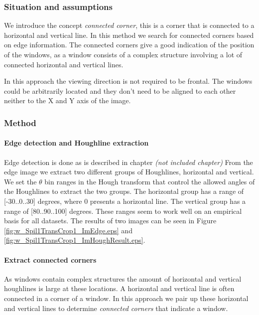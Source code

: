 \subsubsection{Situation and assumptions}
We introduce the concept \emph{connected corner}, this is a corner that is 
connected to a horizontal and vertical line.  
In this method we search for connected corners based on edge information.
The connected corners give a good indication of the position of the windows, as 
a window consists of a complex structure involving a lot of connected horizontal
and vertical lines. 

In this approach the viewing direction is not required to be frontal.
The windows could be arbitrarily located and they don't need
to be aligned to each other neither to the X and Y axis of the image.

\subsubsection{Method}
\paragraph{Edge detection and Houghline extraction}
Edge detection is done as is described in chapter 
\emph{(not included chapter)} %
From the edge image we extract two different groups of Houghlines, horizontal and 
vertical.  We set the $\theta$ bin ranges in the Hough transform that control the
allowed angles of the Houghlines to extract the two groups. The horizontal group
has a range of [-30..0..30] degrees, where 0 presents a horizontal line. The vertical
group has a range of [80..90..100] degrees. These ranges seem
to work well on an empirical basis for all datasets.
The results of two images can be seen in Figure \ref{fig:w_Spil1TransCrop1_ImEdge.eps} and
 \ref{fig:w_Spil1TransCrop1_ImHoughResult.eps}.

\paragraph{Extract connected corners}
 As windows contain complex structures
the amount of horizontal and vertical houghlines is large at these locations.
A horizontal and vertical line is often connected in a corner of a window.  In
this approach we pair up these horizontal and vertical lines to determine
\emph{connected corners} that indicate a window.


